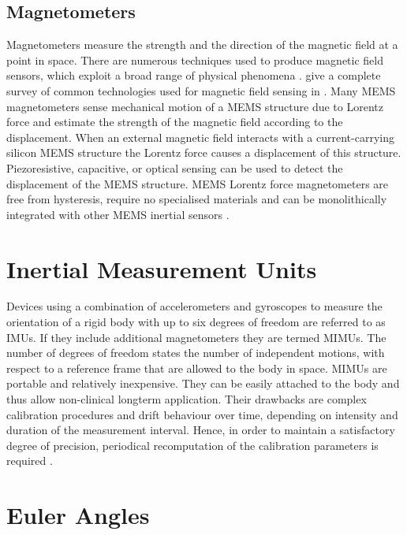 \subsection{Magnetometers}

Magnetometers measure the strength and the direction of the magnetic field at a point in space. There are numerous techniques used to produce magnetic field sensors, which exploit a broad range of physical phenomena \cite{lenz_magnetic_2006}. \citeauthor{lenz_magnetic_2006} give a complete survey of common technologies used for magnetic field sensing in \cite{lenz_magnetic_2006}. Many \gls{MEMS} magnetometers sense mechanical motion of a MEMS structure due to Lorentz force and estimate the strength of the magnetic field according to the displacement. When an external magnetic field interacts with a current-carrying silicon MEMS structure the Lorentz force causes a displacement of this structure. Piezoresistive, capacitive, or optical sensing can be used to detect the displacement of the MEMS structure. MEMS Lorentz force magnetometers are free from hysteresis, require no specialised materials and can be monolithically integrated with other MEMS inertial sensors \cite{thompson_lorentz_2011}.

\section{Inertial Measurement Units}

Devices using a combination of accelerometers and gyroscopes to measure the orientation of a rigid body with up to six degrees of freedom are referred to as \glspl{IMU}. If they include additional magnetometers they are termed \glspl{MIMU}. The number of degrees of freedom states the number of independent motions, with respect to a reference frame that are allowed to the body in space. \glspl{MIMU} are portable and relatively inexpensive. They can be easily attached to the body and thus allow non-clinical longterm application. Their drawbacks are complex calibration procedures and drift behaviour over time, depending on intensity and duration of the measurement interval. Hence, in order to maintain a satisfactory degree of precision, periodical recomputation of the calibration parameters is required \cite{olivares_vicente_signal_2013}.

\section{Euler Angles}

